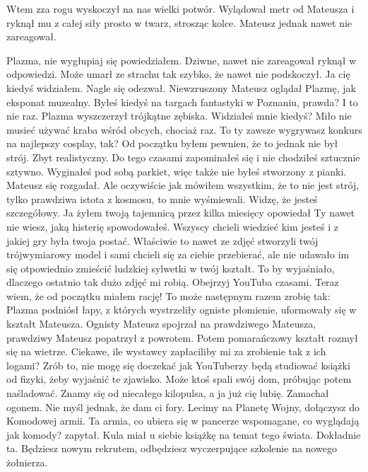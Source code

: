 Wtem zza rogu wyskoczył na nas wielki potwór.
Wylądował metr od Mateusza i ryknął mu z całej siły prosto w twarz, strosząc kolce.
Mateusz jednak nawet nie zareagował.
\begin{dialogue}
\ds{} Plazma, nie wygłupiaj się \dm{} powiedziałem.
\ds{} Dziwne, nawet nie zareagował \dm{} ryknął w odpowiedzi.
\ds{} Może umarł ze strachu tak szybko, że nawet nie podskoczył.
\ds{} Ja cię kiedyś widziałem. \dm{} Nagle się odezwał. Niewzruszony Mateusz oglądał Plazmę, jak eksponat muzealny. \dm{} Byłeś kiedyś na targach fantastyki w Poznaniu, prawda?
\ds{} I to nie raz. \dm{} Plazma wyszczerzył trójkątne zębiska. \dm{} Widziałeś mnie kiedyś? Miło nie musieć używać kraba wśród obcych, chociaż raz.
\ds{} To ty zawsze wygrywasz konkurs na najlepszy cosplay, tak? Od początku byłem pewnien, że to jednak nie był strój. Zbyt realistyczny.
Do tego czasami zapominałeś się i nie chodziłeś sztucznie sztywno. Wyginałeś pod sobą parkiet, więc także nie byłeś stworzony z pianki. \dm{} Mateusz się rozgadał. \dm{} Ale oczywiście jak mówiłem wszystkim, że to nie jest strój, tylko prawdziwa istota
z kosmosu, to mnie wyśmiewali. 
\ds{} Widzę, że jesteś szczegółowy.
\ds{} Ja żyłem twoją tajemnicą przez kilka miesięcy \dm{} opowiedał \dm{} Ty nawet nie wiesz, jaką histerię spowodowałeś. Wszyscy chcieli wiedzieć kim jesteś i z jakiej gry była twoja postać. 
Właściwie to nawet ze zdjęć stworzyli twój trójwymiarowy model i sami chcieli się za ciebie przebierać, ale nie udawało im się otpowiednio zmieścić ludzkiej sylwetki w twój kształt.
\ds{} To by wyjaśniało, dlaczego ostatnio tak dużo zdjęć mi robią.
\ds{} Obejrzyj YouTuba czasami. Teraz wiem, że od początku miałem rację!
\ds{} To może następnym razem zrobię tak: \dm{} Plazma podniósł łapy, z których wystrzeliły ogniste płomienie, uformowały się w kształt Mateusza. 
Ognisty Mateusz spojrzał na prawdziwego Mateusza, prawdziwy Mateusz popatrzył z powrotem. Potem pomarańczowy kształt rozmył się na wietrze. \dm{} 
Ciekawe, ile wystawcy zapłaciliby mi za zrobienie tak z ich logami?
\ds{} Zrób to, nie mogę się doczekać jak YouTuberzy będą studiować książki od fizyki, żeby wyjaśnić te zjawisko. Może ktoś spali swój dom, próbując potem naśladować.
\ds{} Znamy się od niecałego kilopulsa, a ja już cię lubię. \dm{} Zamachał ogonem. \dm{} Nie myśl jednak, że dam ci fory. Lecimy na Planetę Wojny, dołączysz do Komodowej armii.
\ds{} Ta armia, co ubiera się w pancerze wspomagane, co wyglądają jak komody? \dm{} zapytał. \dm{} Kula miał u siebie książkę na temat tego świata.
\ds{} Dokładnie ta. Będziesz nowym rekrutem, odbędziesz wyczerpujące szkolenie na nowego żołnierza. 

\end{dialogue}
